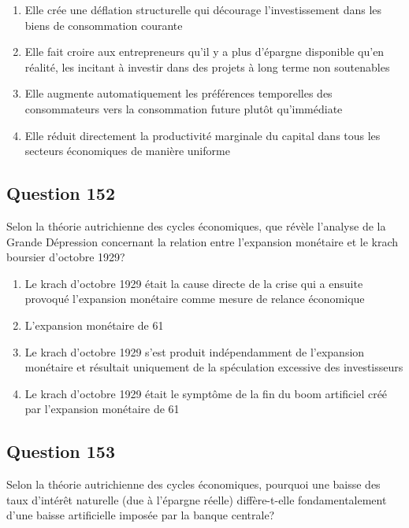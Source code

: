 \documentclass[12pt,a4paper]{article}
\begin{document}
\begin{enumerate}[label=\Alph*., leftmargin=*]
\item Elle crée une déflation structurelle qui décourage l'investissement dans les biens de consommation courante
\item Elle fait croire aux entrepreneurs qu'il y a plus d'épargne disponible qu'en réalité, les incitant à investir dans des projets à long terme non soutenables
\item Elle augmente automatiquement les préférences temporelles des consommateurs vers la consommation future plutôt qu'immédiate
\item Elle réduit directement la productivité marginale du capital dans tous les secteurs économiques de manière uniforme
\end{enumerate}

\bigskip


\subsection*{Question 152}
Selon la théorie autrichienne des cycles économiques, que révèle l'analyse de la Grande Dépression concernant la relation entre l'expansion monétaire et le krach boursier d'octobre 1929?

\begin{enumerate}[label=\Alph*., leftmargin=*]
\item Le krach d'octobre 1929 était la cause directe de la crise qui a ensuite provoqué l'expansion monétaire comme mesure de relance économique
\item L'expansion monétaire de 61%
\item Le krach d'octobre 1929 s'est produit indépendamment de l'expansion monétaire et résultait uniquement de la spéculation excessive des investisseurs
\item Le krach d'octobre 1929 était le symptôme de la fin du boom artificiel créé par l'expansion monétaire de 61%
\end{enumerate}

\bigskip


\subsection*{Question 153}
Selon la théorie autrichienne des cycles économiques, pourquoi une baisse des taux d'intérêt naturelle (due à l'épargne réelle) diffère-t-elle fondamentalement d'une baisse artificielle imposée par la banque centrale?
\end{document}
